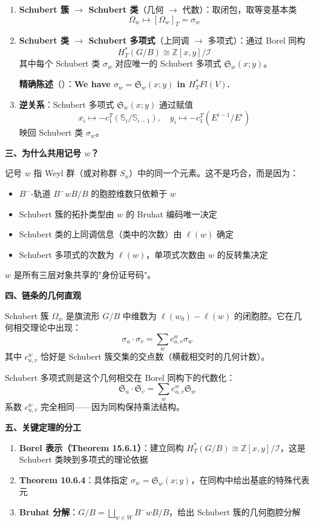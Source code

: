 \begin{enumerate}
\item \textbf{Schubert 簇 $\to$ Schubert 类}（几何 $\to$ 代数）：取闭包，取等变基本类
$$\Omega_w \mapsto [\Omega_w]_T = \sigma_w$$

\item \textbf{Schubert 类 $\to$ Schubert 多项式}（上同调 $\to$ 多项式）：通过 Borel 同构
$$H_T^*(G/B) \cong \mathbb{Z}[x,y]/\mathcal{I}$$
其中每个 Schubert 类 $\sigma_w$ 对应唯一的 Schubert 多项式 $\mathfrak{S}_w(x;y)$。

\textbf{精确陈述}（\cite[ Theorem 10.6.4]{anderson2023}）：\textbf{We have $\sigma_w = \mathfrak{S}_w(x;y)$ in $H_T^* Fl(V)$.}

\item \textbf{逆关系}：Schubert 多项式 $\mathfrak{S}_w(x;y)$ 通过赋值
$$x_i \mapsto -c_1^T(\mathbb{S}_i/\mathbb{S}_{i-1}), \quad y_i \mapsto -c_1^T(E^{i-1}/E^i)$$
映回 Schubert 类 $\sigma_w$。
\end{enumerate}

\textbf{三、为什么共用记号 $w$？}

记号 $w$ 指 Weyl 群（或对称群 $S_n$）中的同一个元素。这不是巧合，而是因为：

\begin{itemize}
\item $B^-$-轨道 $B^-wB/B$ 的胞腔维数只依赖于 $w$
\item Schubert 簇的拓扑类型由 $w$ 的 Bruhat 编码唯一决定
\item Schubert 类的上同调信息（类中的次数）由 $\ell(w)$ 确定
\item Schubert 多项式的次数为 $\ell(w)$，单项式次数由 $w$ 的反转集决定
\end{itemize}

$w$ 是所有三层对象共享的"身份证号码"。

\textbf{四、链条的几何直观}

Schubert 簇 $\Omega_w$ 是旗流形 $G/B$ 中维数为 $\ell(w_0)-\ell(w)$ 的闭胞腔。它在几何相交理论中出现：
$$\sigma_u \cdot \sigma_v = \sum_w c_{u,v}^w \sigma_w$$
其中 $c_{u,v}^w$ 恰好是 Schubert 簇交集的交点数（横截相交时的几何计数）。

Schubert 多项式则是这个几何相交在 Borel 同构下的代数化：
$$\mathfrak{S}_u \cdot \mathfrak{S}_v = \sum_w c_{u,v}^w \mathfrak{S}_w$$
系数 $c_{u,v}^w$ 完全相同——因为同构保持乘法结构。

\textbf{五、关键定理的分工}

\begin{enumerate}
\item \textbf{Borel 表示（Theorem 15.6.1）}：建立同构 $H_T^*(G/B) \cong \mathbb{Z}[x,y]/\mathcal{I}$，这是 Schubert 类映到多项式的理论依据
\item \textbf{Theorem 10.6.4}：具体指定 $\sigma_w = \mathfrak{S}_w(x;y)$，在同构中给出基底的特殊代表元
\item \textbf{Bruhat 分解}：$G/B = \bigsqcup_{w \in W} B^-wB/B$，给出 Schubert 簇的几何胞腔分解
\end{enumerate}

